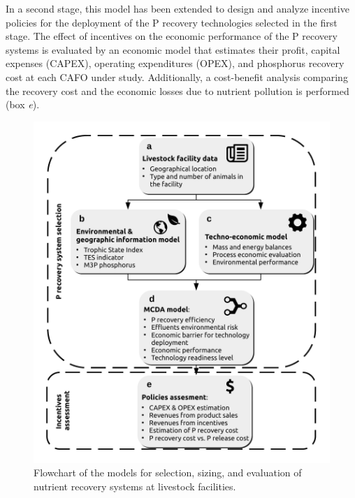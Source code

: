 \begin{refsection}[referencesCh5]
In a second stage, this model has been extended to design and analyze
incentive policies for
the deployment of the P recovery technologies selected in the first stage. The effect of incentives on the economic performance of the P recovery systems is evaluated
%
by an economic model that estimates their profit,
capital expenses (CAPEX), operating expenditures (OPEX), and phosphorus recovery cost
at each CAFO under study.
Additionally, a cost-benefit analysis comparing the recovery cost and the economic losses due to nutrient pollution is performed (box \textit{e}).

\begin{figure}[h!]
	\centering
	\includegraphics[width=0.7\linewidth, trim={1cm 1cm 1cm 1cm},clip]{gfx/Chapter5/tool_diagram_v4colorClean.pdf} 
	\caption{Flowchart of the models for selection, sizing, and evaluation of nutrient recovery systems at livestock facilities.}
	\label{fig:tool_diagram}
\end{figure}


\end{refsection}

